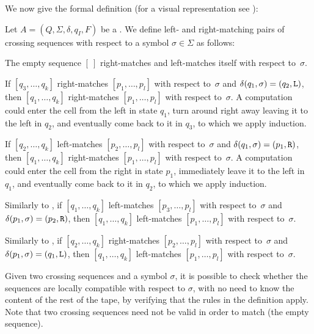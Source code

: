 We now give the formal definition (for a visual representation see ):
\begin{defn}\label{def:crossmatch2DFA}
	Let $A=(Q,\Sigma,\delta,q_I,F)$ be a \TDFA.
	We define left- and right-matching pairs of crossing sequences with respect to a symbol $\sigma\in\Sigma$ as follows:
	\begin{rules}
		\item \label{itm:crossmatch2DFA-1} The empty sequence $[~]$ right-matches and left-matches itself with respect to~$\sigma$.
		\item \label{itm:crossmatch2DFA-2} If $[q_3,\dots,q_k]$ right-matches $[p_1,\dots,p_l]$ with respect to~$\sigma$ and $\delta(q_1,\sigma)=(q_2,\mathtt L)$, then $[q_1,\dots,q_k]$ right-matches $[p_1,\dots,p_l]$ with respect to~$\sigma$.
		A computation could enter the cell from the left in state $q_1$, turn around right away leaving it to the left in $q_2$, and eventually come back to it in $q_3$, to which we apply induction.
		\item \label{itm:crossmatch2DFA-3} If $[q_2,\dots,q_k]$ left-matches $[p_2,\dots,p_l]$ with respect to~$\sigma$ and $\delta(q_1,\sigma)=(p_1,\mathtt R)$, then $[q_1,\dots,q_k]$ right-matches $[p_1,\dots,p_l]$ with respect to~$\sigma$.
		A computation could enter the cell from the right in state $p_1$, immediately leave it to the left in $q_1$, and eventually come back to it in $q_2$, to which we apply induction.
		\item \label{itm:crossmatch2DFA-4} Similarly to , if $[q_1,\dots,q_k]$ left-matches $[p_3,\dots,p_l]$ with respect to~$\sigma$ and $\delta(p_1,\sigma)=(p_2,\mathtt R)$, then $[q_1,\dots,q_k]$ left-matches $[p_1,\dots,p_l]$ with respect to~$\sigma$.
		\item \label{itm:crossmatch2DFA-5} Similarly to , if $[q_2,\dots,q_k]$ right-matches $[p_2,\dots,p_l]$ with respect to~$\sigma$ and $\delta(p_1,\sigma)=(q_1,\mathtt L)$, then $[q_1,\dots,q_k]$ left-matches $[p_1,\dots,p_l]$ with respect to~$\sigma$.
	\end{rules}
\end{defn}
Given two crossing sequences and a symbol $\sigma$, it is possible to check whether the sequences are locally compatible with respect to $\sigma$, with no need to know the content of the rest of the tape, by verifying that the rules in the definition apply.
Note that two crossing sequences need not be valid in order to match (\eg the empty sequence).

